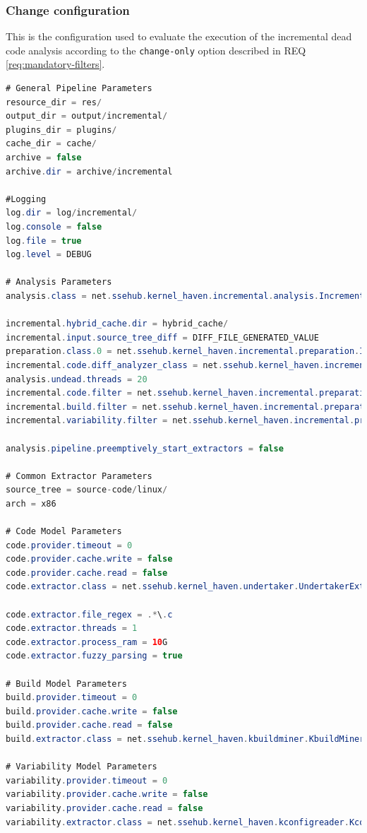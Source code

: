 \documentclass[a4paper]{article}
\begin{document}
\subsubsection{Change configuration}

This is the configuration used to evaluate the execution of the incremental dead code analysis according to the \texttt{change-only} option described in  REQ \ref{req:mandatory-filters}.

\begin{lstlisting}[language=java]
# General Pipeline Parameters 
resource_dir = res/
output_dir = output/incremental/
plugins_dir = plugins/
cache_dir = cache/
archive = false
archive.dir = archive/incremental

#Logging
log.dir = log/incremental/
log.console = false
log.file = true
log.level = DEBUG

# Analysis Parameters
analysis.class = net.ssehub.kernel_haven.incremental.analysis.IncrementalThreadedDeadCodeAnalysis

incremental.hybrid_cache.dir = hybrid_cache/
incremental.input.source_tree_diff = DIFF_FILE_GENERATED_VALUE
preparation.class.0 = net.ssehub.kernel_haven.incremental.preparation.IncrementalPreparation
incremental.code.diff_analyzer_class = net.ssehub.kernel_haven.incremental.diff.analyzer.SimpleDiffAnalyzer
analysis.undead.threads = 20
incremental.code.filter = net.ssehub.kernel_haven.incremental.preparation.filter.ChangeFilter
incremental.build.filter = net.ssehub.kernel_haven.incremental.preparation.filter.ChangeFilter
incremental.variability.filter = net.ssehub.kernel_haven.incremental.preparation.filter.ChangeFilter

analysis.pipeline.preemptively_start_extractors = false

# Common Extractor Parameters
source_tree = source-code/linux/
arch = x86

# Code Model Parameters
code.provider.timeout = 0
code.provider.cache.write = false
code.provider.cache.read = false
code.extractor.class = net.ssehub.kernel_haven.undertaker.UndertakerExtractor

code.extractor.file_regex = .*\.c
code.extractor.threads = 1
code.extractor.process_ram = 10G
code.extractor.fuzzy_parsing = true

# Build Model Parameters 
build.provider.timeout = 0
build.provider.cache.write = false
build.provider.cache.read = false
build.extractor.class = net.ssehub.kernel_haven.kbuildminer.KbuildMinerExtractor

# Variability Model Parameters
variability.provider.timeout = 0
variability.provider.cache.write = false
variability.provider.cache.read = false
variability.extractor.class = net.ssehub.kernel_haven.kconfigreader.KconfigReaderExtractor
\end{lstlisting}
\end{document}
